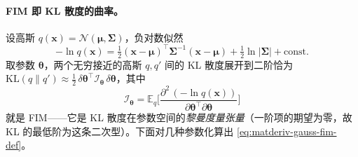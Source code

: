 \paragraph{FIM 即 KL 散度的曲率。}
设高斯 $q(\mathbf{x})=\mathcal{N}(\boldsymbol{\mu},\boldsymbol{\Sigma})$，负对数似然
\begin{equation}
  -\ln q(\mathbf{x})=\tfrac12(\mathbf{x}-\boldsymbol{\mu})^\top\boldsymbol{\Sigma}^{-1}(\mathbf{x}-\boldsymbol{\mu})+\tfrac12\ln|\boldsymbol{\Sigma}|+\text{const}.
  \label{eq:matderiv-gauss-nll}
\end{equation}
取参数 $\boldsymbol{\theta}$，两个无穷接近的高斯 $q,q'$ 间的 KL 散度展开到二阶恰为 $\mathrm{KL}(q\|q')\approx\tfrac12\,\delta\boldsymbol{\theta}^\top\boldsymbol{\mathcal{I}}_{\boldsymbol{\theta}}\,\delta\boldsymbol{\theta}$，其中
\begin{equation}
  \boldsymbol{\mathcal{I}}_{\boldsymbol{\theta}}=\mathbb{E}_q\Big[\frac{\partial^2\,(-\ln q(\mathbf{x}))}{\partial\boldsymbol{\theta}^\top\partial\boldsymbol{\theta}}\Big]
  \label{eq:matderiv-gauss-fim-def}
\end{equation}
就是 FIM——它是 KL 散度在参数空间的\emph{黎曼度量张量}（一阶项的期望为零，故 KL 的最低阶为这条二次型）\cite{barfoot2024state}。下面对几种参数化算出 \cref{eq:matderiv-gauss-fim-def}。

